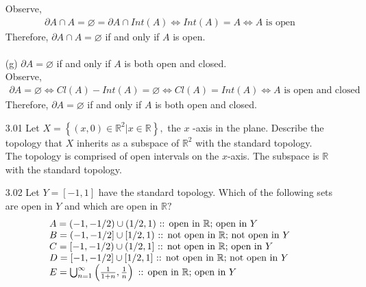 \documentclass[12pt]{article}
\newcommand{\R}{\mathbb{R}}
\begin{document}
\begin{enumerate}
		Observe,
		\begin{align*}
			\partial A \cap A =\varnothing = \partial A \cap Int(A) \Leftrightarrow Int(A)=A \Leftrightarrow A \text{ is open}
		\end{align*}
		 Therefore, $\partial A \cap A=\varnothing$ if and only if $A$ is open.\\
		\\(g) $\partial A=\varnothing$ if and only if $A$ is both open and closed.\\
		Observe,
			\begin{align*}
				\partial A=\varnothing \Leftrightarrow Cl(A)-Int(A)= \varnothing \Leftrightarrow Cl(A)=Int(A) \Leftrightarrow A \text{ is open and closed}
			\end{align*}
		Therefore, $\partial A=\varnothing$ if and only if $A$ is both open and closed.\\
		\item[3.01] Let $X=\left\{(x, 0) \in \mathbb{R}^{2} | x \in \mathbb{R}\right\},$ the $x$ -axis in the plane. Describe the topology that $X$ inherits as a subspace of $\mathbb{R}^{2}$ with the standard topology.\\
		The topology is comprised of open intervals on the $x$-axis. The subspace is $ \R $ with the standard topology.
		
		\item[3.02] Let $Y=[-1,1]$ have the standard topology. Which of the following sets are open in $Y$ and which are open in $\mathbb{R} ?$
		$$
		\begin{array}{l}
		A=(-1,-1 / 2) \cup(1 / 2,1)  \text{ :: open in $ \R $; open in $ Y $}\\
		B=(-1,-1 / 2] \cup[1 / 2,1)  \text{ :: not open in $ \R $; not open in $ Y $} \\
		C=[-1,-1 / 2) \cup(1 / 2,1]  \text{ :: not open in $ \R $; open in $ Y $}\\
		D=[-1,-1 / 2] \cup[1 / 2,1]  \text{ :: not open in $ \R $; not open in $ Y $}\\
		E=\bigcup_{n=1}^{\infty}\left(\frac{1}{1+n}, \frac{1}{n}\right) \text{ :: open in $ \R $; open in $ Y $}
		\end{array}
		$$
		

\end{enumerate}
\end{document}
